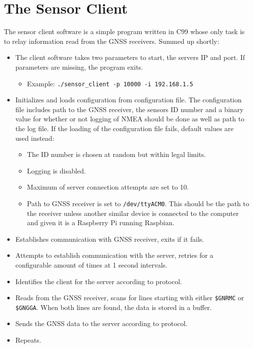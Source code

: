 \documentclass[12pt,english,a4paper]{report}
\begin{document}
\section{The Sensor Client}
The sensor client software is a simple program written in C99 whose only task is to relay information read from the GNSS receivers. Summed up shortly:
\begin{itemize}
  \item The client software takes two parameters to start, the servers IP and port. If parameters are missing, the program exits.
  \begin{itemize}
    \item Example: \texttt{./sensor\_client -p 10000 -i 192.168.1.5}
  \end{itemize}
  \item Initializes and loads configuration from configuration file. The configuration file includes path to the GNSS receiver, the sensors ID number and a binary value for whether or not logging of NMEA should be done as well as path to 
  the log file. If the loading of the configuration file fails, default values are used instead:
  \begin{itemize}
    \item The ID number is chosen at random but within legal limits.
    \item Logging is disabled.
    \item Maximum of server connection attempts are set to 10.
    \item Path to GNSS receiver is set to \texttt{/dev/ttyACM0}. This should be the path to the receiver unless another similar device is connected to the computer and given it is a Raspberry Pi running Raspbian.
  \end{itemize}
  \item Establishes communication with GNSS receiver, exits if it fails.
  \item Attempts to establish communication with the server, retries for a configurable amount of times at 1 second intervals.
  \item Identifies the client for the server according to protocol.
  \item Reads from the GNSS receiver, scans for lines starting with either \texttt{\$GNRMC} or \texttt{\$GNGGA}. When both lines are found, the data is stored in a buffer.
  \item Sends the GNSS data to the server according to protocol.
  \item Repeats.
\end{itemize}
\end{document}
